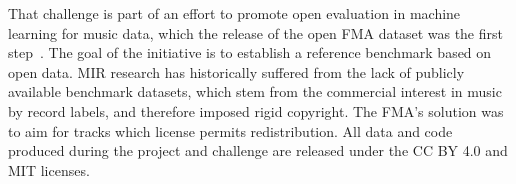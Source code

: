 \documentclass[sigconf]{acmart}
\begin{document}
That challenge is part of an effort to promote open evaluation in machine learning for music data, which the release of the open FMA dataset was the first step~\cite{fma_dataset}. The goal of the initiative is to establish a reference benchmark based on open data. MIR research has historically suffered from the lack of publicly available benchmark datasets, which stem from the commercial interest in music by record labels, and therefore imposed rigid copyright. The FMA's solution was to aim for tracks which license permits redistribution. All data and code produced during the project and challenge are released under the CC BY 4.0 and MIT licenses.




\end{document}
